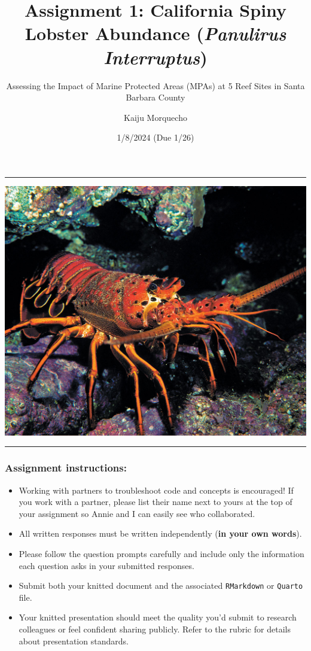 \documentclass[
]{article}
\title{Assignment 1: California Spiny Lobster Abundance (\emph{Panulirus
Interruptus})}
\subtitle{Assessing the Impact of Marine Protected Areas (MPAs) at 5
Reef Sites in Santa Barbara County}
\author{Kaiju Morquecho}
\date{1/8/2024 (Due 1/26)}
\begin{document}
\maketitle

\begin{center}\rule{0.5\linewidth}{0.5pt}\end{center}

\includegraphics{figures/spiny2.jpg}

\begin{center}\rule{0.5\linewidth}{0.5pt}\end{center}

\subsubsection{Assignment instructions:}\label{assignment-instructions}

\begin{itemize}
\item
  Working with partners to troubleshoot code and concepts is encouraged!
  If you work with a partner, please list their name next to yours at
  the top of your assignment so Annie and I can easily see who
  collaborated.
\item
  All written responses must be written independently (\textbf{in your
  own words}).
\item
  Please follow the question prompts carefully and include only the
  information each question asks in your submitted responses.
\item
  Submit both your knitted document and the associated
  \texttt{RMarkdown} or \texttt{Quarto} file.
\item
  Your knitted presentation should meet the quality you'd submit to
  research colleagues or feel confident sharing publicly. Refer to the
  rubric for details about presentation standards.
\end{itemize}
\end{document}
